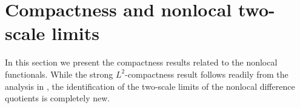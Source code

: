 \documentclass[reqno,11pt]{amsart}
\numberwithin{equation}{section}
\theoremstyle{thmlemcorr}
\numberwithin{theorem}{section}
\newtheorem{lemma}[theorem]{Lemma}
\theoremstyle{thmlemcorr*}
\theoremstyle{defi}
\theoremstyle{remexample}
\theoremstyle{ass}
\newcommand{\R}{\mathbb{R}}
\newcommand{\Ecal}{\mathcal{E}}
\newcommand{\Fcal}{\mathcal{F}}
\newcommand{\Hcal}{\mathcal{H}}
\renewcommand{\epsilon}{\varepsilon}
\newcommand{\dd}{\,\mathrm{d}}
\DeclarePairedDelimiter{\abs}{\lvert}{\rvert}
\DeclarePairedDelimiter{\norm}{\lVert}{\rVert}
\newcommand{\1}{\mathds{1}}
\newcommand{\comment}[1]{{\textcolor{red}{$\langle\hspace{-0.3ex}\langle$Leon: #1$\rangle\hspace{-0.3ex}\rangle$}}}
\begin{document}




\section{Compactness and nonlocal two-scale limits}\label{sec:compactness}

In this section we present the compactness results related to the nonlocal functionals. While the strong $L^2$-compactness result follows readily from the analysis in \cite{DDG24}, the identification of the two-scale limits of the nonlocal difference quotients is completely new. 

\end{document}
